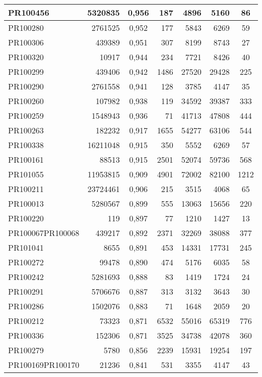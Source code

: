 \begin{center}
\begin{longtable}{lr|c|rrr|c}
	PR100456 & 5320835 & 0,956 & 187 & 4896 & 5160 & 86 \\ \hline
	PR100280 & 2761525 & 0,952 & 177 & 5843 & 6269 & 59 \\ \hline
	PR100306 & 439389 & 0,951 & 307 & 8199 & 8743 & 27 \\ \hline
	PR100320 & 10917 & 0,944 & 234 & 7721 & 8426 & 40 \\ \hline
	PR100299 & 439406 & 0,942 & 1486 & 27520 & 29428 & 225 \\ \hline
	PR100290 & 2761558 & 0,941 & 128 & 3785 & 4147 & 35 \\ \hline
	PR100260 & 107982 & 0,938 & 119 & 34592 & 39387 & 333 \\ \hline
	PR100259 & 1548943 & 0,936 & 71 & 41713 & 47808 & 444 \\ \hline
	PR100263 & 182232 & 0,917 & 1655 & 54277 & 63106 & 544 \\ \hline
	PR100338 & 16211048 & 0,915 & 350 & 5552 & 6269 & 57 \\ \hline
	PR100161 & 88513 & 0,915 & 2501 & 52074 & 59736 & 568 \\ \hline
	PR101055 & 11953815 & 0,909 & 4901 & 72002 & 82100 & 1212 \\ \hline
	PR100211 & 23724461 & 0,906 & 215 & 3515 & 4068 & 65 \\ \hline
	PR100013 & 5280567 & 0,899 & 555 & 13063 & 15656 & 220 \\ \hline
	PR100220 & 119 & 0,897 & 77 & 1210 & 1427 & 13 \\ \hline
	PR100067PR100068 & 439217 & 0,892 & 2371 & 32269 & 38088 & 377 \\ \hline
	PR101041 & 8655 & 0,891 & 453 & 14331 & 17731 & 245 \\ \hline
	PR100272 & 99478 & 0,890 & 474 & 5176 & 6035 & 58 \\ \hline
	PR100242 & 5281693 & 0,888 & 83 & 1419 & 1724 & 24 \\ \hline
	PR100291 & 5706676 & 0,887 & 313 & 3132 & 3643 & 30 \\ \hline
	PR100286 & 1502076 & 0,883 & 71 & 1648 & 2059 & 20 \\ \hline
	PR100212 & 73323 & 0,871 & 6532 & 55016 & 65319 & 776 \\ \hline
	PR100336 & 152306 & 0,871 & 3525 & 34738 & 42078 & 360 \\ \hline
	PR100279 & 5780 & 0,856 & 2239 & 15931 & 19254 & 197 \\ \hline
	PR100169PR100170 & 21236 & 0,841 & 531 & 3355 & 4147 & 43 \\ \hline

\end{longtable}
\end{center}

